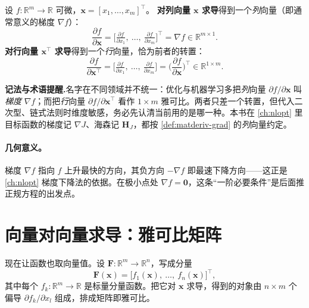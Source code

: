 \begin{definition}[标量对向量求导（梯度）]\label{def:matderiv-grad}
设 $f:\mathbb{R}^m\to\mathbb{R}$ 可微，$\mathbf{x}=[x_1,\dots,x_m]^\top$。
\textbf{对列向量 $\mathbf{x}$ 求导}得到一个\emph{列}向量（即通常意义的梯度 $\nabla f$）：
\begin{equation}
  \frac{\partial f}{\partial\mathbf{x}}
  =\Big[\tfrac{\partial f}{\partial x_1},\ \dots,\ \tfrac{\partial f}{\partial x_m}\Big]^\top
  =\nabla f\in\mathbb{R}^{m\times 1}.
  \label{eq:matderiv-grad-col}
\end{equation}
\textbf{对行向量 $\mathbf{x}^\top$ 求导}得到一个\emph{行}向量，恰为前者的转置：
\begin{equation}
  \frac{\partial f}{\partial\mathbf{x}^\top}
  =\Big[\tfrac{\partial f}{\partial x_1},\ \dots,\ \tfrac{\partial f}{\partial x_m}\Big]
  =\Big(\frac{\partial f}{\partial\mathbf{x}}\Big)^{\!\top}\in\mathbb{R}^{1\times m}.
  \label{eq:matderiv-grad-row}
\end{equation}
\end{definition}

\begin{note}
\textbf{记法与术语提醒.}\;名字在不同领域并不统一：优化与机器学习多把\emph{列}向量 $\partial f/\partial\mathbf{x}$ 叫\emph{梯度} $\nabla f$；而把\emph{行}向量 $\partial f/\partial\mathbf{x}^\top$ 看作 $1\times m$ 雅可比。两者只差一个转置，但代入二次型、链式法则时维度敏感，务必先认清当前用的是哪一种。本书在 \cref{ch:nlopt} 里目标函数的梯度记 $\nabla J$、海森记 $\mathbf{H}_J$，都按 \cref{def:matderiv-grad} 的\emph{列}向量约定。
\end{note}

\paragraph{几何意义。}
梯度 $\nabla f$ 指向 $f$ 上升最快的方向，其负方向 $-\nabla f$ 即最速下降方向——这正是 \cref{ch:nlopt} 梯度下降法的依据。在极小点处 $\nabla f=\mathbf{0}$，这条“一阶必要条件”是后面推正规方程的出发点。

\section{向量对向量求导：雅可比矩阵}
\label{sec:matderiv-jacobian}

现在让函数也取向量值。设 $\mathbf{F}:\mathbb{R}^m\to\mathbb{R}^n$，写成分量
\begin{equation}
  \mathbf{F}(\mathbf{x})=\big[f_1(\mathbf{x}),\ \dots,\ f_n(\mathbf{x})\big]^\top,
  \label{eq:matderiv-vecfun}
\end{equation}
其中每个 $f_k:\mathbb{R}^m\to\mathbb{R}$ 是标量分量函数。把它对 $\mathbf{x}$ 求导，得到的对象由 $n\times m$ 个偏导 $\partial f_k/\partial x_l$ 组成，排成矩阵即雅可比。


